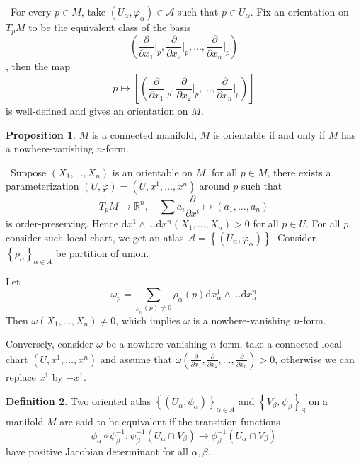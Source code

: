 \documentclass[12pt,a4paper]{book}
\newenvironment{prooff}{{\noindent\it\textcolor{cyan!40!black}{Proof}:}\,}{\par}
\newcommand{\bbrace}[1]{\left\{ #1 \right\} }
\newcommand{\bb}[1]{\mathbb{#1}}
\theoremstyle{definition}
\newtheorem{defn}{Definition}[section]
\newtheorem{prop}[defn]{Proposition}
\begin{document}
\begin{prooff}
    For every $p\in M$, take $(U_{\alpha},\varphi_{\alpha})\in \mathcal{A}$ such that $p\in U_{\alpha}$. Fix an orientation on $T_p M$ to be the equivalent class of the basis $$(\frac{\partial}{\partial x_1}\bigg|_p,\frac{\partial}{\partial x_2}\bigg|_p,\dots,\frac{\partial}{\partial x_n}\bigg|_p)$$, then the map
    \begin{equation*}
        p\mapsto [(\frac{\partial}{\partial x_1}\bigg|_p,\frac{\partial}{\partial x_2}\bigg|_p,\dots,\frac{\partial}{\partial x_n}\bigg|_p)]
    \end{equation*}
    is well-defined and gives an orientation on $M$.
\end{prooff}
\begin{prop}
    $M$ is a connected manifold, $M$ is orientable if and only if $M$ has a nowhere-vanishing $n$-form.
\end{prop}
\begin{prooff}
    Suppose $(X_1,\dots,X_n)$ is an orientable on $M$, for all $p\in M$, there exists a parameterization $(U,\varphi)=(U,x^1,\dots,x^n)$ around $p$ such that
    $$
        T_pM\rightarrow \bb{R}^n,\quad \sum a_i\frac{\partial}{\partial x^i}\mapsto (a_1,\dots,a_n)
    $$
    is order-preserving.
    Hence $\text{d}x^1\wedge\dots \text{d}x^n(X_1,\dots,X_n)>0$ for all $p\in U$. For all $p$, consider such local chart, we get an atlas
    $\mathcal{A}=\left\{\left(U_\alpha, \varphi_\alpha\right)\right\}$. Consider $\bbrace{\rho_{\alpha}}_{\alpha\in A}$ be partition of union.

    Let
    \begin{equation*}
        \omega_p= \sum_{\rho_{\alpha}(p)\neq 0} \rho_{\alpha}(p)\text{d}x^1_{\alpha}\wedge\dots \text{d}x^n_{\alpha}
    \end{equation*}
    Then $\omega(X_1,\dots,X_n)\neq 0$, which implies $\omega $ is a nowhere-vanishing $n$-form.

    Conversely, consider $\omega$ be a nowhere-vanishing $n$-form, take a connected local chart $(U,x^1,\dots,x^n)$ and assume that $\omega(\frac{\partial}{\partial x_1},\frac{\partial}{\partial x_2},\dots,\frac{\partial}{\partial x_n})>0$, otherwise we can replace $x^1$ by $-x^1$.
\end{prooff}
\begin{defn}
    Two oriented atlas $\bbrace{(U_{\alpha},\phi_{\alpha})}_{\alpha\in A}$ and $\bbrace{V_{\beta},\psi_{\beta}}_{\beta}$ on a manifold $M$ are said to be equivalent if the transition functions
    \begin{equation*}
        \phi_{\alpha}\circ\psi_{\beta}^{-1}:\psi_{\beta}^{-1}(U_{\alpha}\cap V_{\beta})\rightarrow \phi_{\beta}^{-1}(U_{\alpha}\cap V_{\beta})
    \end{equation*}
    have positive Jacobian determinant for all $\alpha,\beta$.
\end{defn}
\end{document}
